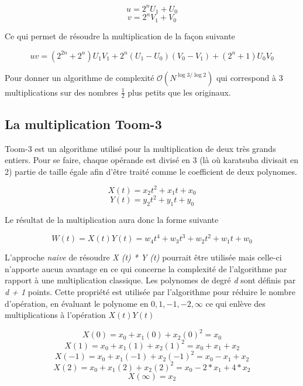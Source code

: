 \documentclass[letterpaper]{article}
\begin{document}
  $$u = 2^{n} U_1 + U_0$$
  $$v = 2^{n} V_1 + V_0$$

Ce qui permet de résoudre la multiplication de la façon suivante

  $$uv = (2^{2n} + 2^n) U_1 V_1 + 2^n (U_1 - U_0) (V_0 - V_1) + (2^n + 1) U_0 V_0$$

Pour donner un algorithme de complexité $\mathcal{O}(N^{\log{3}/\log{2}})$ qui
correspond à $3$ multiplications sur des nombres $\frac{1}{2}$ plus petits que
les originaux\cite{gmplibkaratsuba}.

\subsection{La multiplication Toom-3}

Toom-3 est un algorithme utilisé pour la multiplication de deux très grands
entiers. Pour se faire, chaque opérande est divisé en 3 (là où karatsuba
divisait en 2) partie de taille égale afin d'être traité comme le
coefficient de deux polynomes\cite{gmplib2014}.

    $$X(t) = x_2 t^2 + x_1 t + x_0$$
    $$Y(t) = y_2 t^2 + y_1 t + y_0$$

Le résultat de la multiplication aura donc la forme suivante

    $$W(t) = X(t) Y(t) =  w_4 t^4 + w_3 t^3 + w_2 t^2 + w_1 t + w_0$$

L'approche \emph{naive} de résoudre \emph{X (t) * Y (t)} pourrait être utilisée
mais celle-ci n'apporte aucun avantage en ce qui concerne la complexité de
l'algorithme par rapport à une multiplication classique.\cite{gmplib2014}
\newline
Les polynomes de degré \emph{d} sont définis par \emph{d + 1} points. Cette
propriété est utilisée par l'algorithme pour réduire le nombre d'opération, en
évaluant le polynome en $0, 1, -1, -2, \infty$ ce qui enlève des multiplications
à l'opération $X(t) Y(t)$\cite{wikitoom3}

    $$X (0) = x_{0} + x_{1} (0) + x_2 {(0)}^{2} = x_{0}$$
    $$X(1) = x_0 + x_1(1) + x_2{(1)}^2 = x_0 + x_1 + x_2$$
    $$X(-1) = x_0 + x_1(-1) + x_2{(-1)}^2 = x_0 - x_1 + x_2$$
    $$X(2) = x_0 + x_1(2) + x_2{(2)}^2 = x_0 - 2 * x_1 + 4 * x_2$$
    $$X(\infty) = x_2$$
\end{document}
